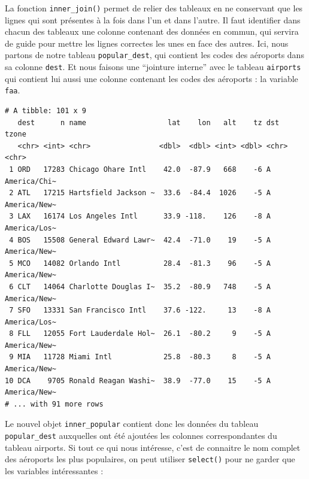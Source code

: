 \documentclass[a4paperpaper,]{article}
\newenvironment{Shaded}{\begin{snugshade}}{\end{snugshade}}
\newcommand{\DataTypeTok}[1]{\textcolor[rgb]{0.00,0.34,0.68}{#1}}
\newcommand{\KeywordTok}[1]{\textcolor[rgb]{0.12,0.11,0.11}{\textbf{#1}}}
\newcommand{\NormalTok}[1]{\textcolor[rgb]{0.12,0.11,0.11}{#1}}
\newcommand{\OperatorTok}[1]{\textcolor[rgb]{0.12,0.11,0.11}{#1}}
\newcommand{\StringTok}[1]{\textcolor[rgb]{0.75,0.01,0.01}{#1}}
\theoremstyle{definition}
\theoremstyle{definition}
\theoremstyle{definition}
\theoremstyle{remark}
\begin{document}
La fonction \texttt{inner\_join()} permet de relier des tableaux en ne
conservant que les lignes qui sont présentes à la fois dans l'un et dans
l'autre. Il faut identifier dans chacun des tableaux une colonne
contenant des données en commun, qui servira de guide pour mettre les
lignes correctes les unes en face des autres. Ici, nous partons de notre
tableau \texttt{popular\_dest}, qui contient les codes des aéroports
dans sa colonne \texttt{dest}. Et nous faisons une ``jointure interne''
avec le tableau \texttt{airports} qui contient lui aussi une colonne
contenant les codes des aéroports : la variable \texttt{faa}.

\begin{Shaded}
\end{Shaded}

\begin{verbatim}
# A tibble: 101 x 9
   dest      n name                   lat    lon   alt    tz dst   tzone       
   <chr> <int> <chr>                <dbl>  <dbl> <int> <dbl> <chr> <chr>       
 1 ORD   17283 Chicago Ohare Intl    42.0  -87.9   668    -6 A     America/Chi~
 2 ATL   17215 Hartsfield Jackson ~  33.6  -84.4  1026    -5 A     America/New~
 3 LAX   16174 Los Angeles Intl      33.9 -118.    126    -8 A     America/Los~
 4 BOS   15508 General Edward Lawr~  42.4  -71.0    19    -5 A     America/New~
 5 MCO   14082 Orlando Intl          28.4  -81.3    96    -5 A     America/New~
 6 CLT   14064 Charlotte Douglas I~  35.2  -80.9   748    -5 A     America/New~
 7 SFO   13331 San Francisco Intl    37.6 -122.     13    -8 A     America/Los~
 8 FLL   12055 Fort Lauderdale Hol~  26.1  -80.2     9    -5 A     America/New~
 9 MIA   11728 Miami Intl            25.8  -80.3     8    -5 A     America/New~
10 DCA    9705 Ronald Reagan Washi~  38.9  -77.0    15    -5 A     America/New~
# ... with 91 more rows
\end{verbatim}

Le nouvel objet \texttt{inner\_popular} contient donc les données du
tableau \texttt{popular\_dest} auxquelles ont été ajoutées les colonnes
correspondantes du tableau airports. Si tout ce qui nous intéresse,
c'est de connaitre le nom complet des aéroports les plus populaires, on
peut utiliser \texttt{select()} pour ne garder que les variables
intéressantes :
\end{document}
